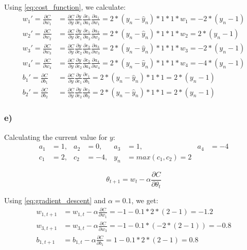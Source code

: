 Using \cref{eq:cost_function}, we calculate: 
\begin{align*}
        w_1' = \frac{ \partial C}{\partial w_1} 
    &= \frac{\partial C}{\partial y} \frac{\partial y}{\partial c_1} 
    \frac{\partial c_1}{\partial a_1} \frac{\partial a_1}{\partial w_1}
    = 2 * (y_n - \hat{y}_n) * 1 * 1 * w_1 = - 2 * (y_n - 1) \\
        w_2' = \frac{\partial C}{\partial w_2} 
    &= \frac{\partial C}{\partial y} \frac{\partial y}{\partial c_1} 
    \frac{\partial c_1}{\partial a_2} \frac{\partial a_2}{\partial w_2}
    = 2 * (y_n - \hat{y}_n) * 1 * 1 * w_2 = 2 * (y_n - 1) \\
        w_3' = \frac{\partial C}{\partial w_3} 
    &= \frac{\partial C}{\partial y} \frac{\partial y}{\partial c_2} 
    \frac{\partial c_2}{\partial a_3} \frac{\partial a_3}{\partial w_3}
    = 2 * (y_n - \hat{y}_n) * 1 * 1 * w_3 = - 2 * (y_n - 1) \\
        w_4' = \frac{\partial C}{\partial w_4} 
    &= \frac{\partial C}{\partial y} \frac{\partial y}{\partial c_2} 
    \frac{\partial c_2}{\partial a_4} \frac{\partial a_4}{\partial w_4}
    = 2 * (y_n - \hat{y}_n) * 1 * 1 * w_4 = - 4 * (y_n - 1) \\
        b_1' = \frac{\partial C}{\partial b_1} 
    &= \frac{\partial C}{\partial y} \frac{\partial y}{\partial c_1} 
    \frac{\partial c_1}{\partial b_1} 
    = 2 * (y_n - \hat{y}_n) * 1 * 1 = 2 * (y_n - 1) \\ 
        b_2' = \frac{\partial C}{\partial b_2}
    &= \frac{\partial C}{\partial y} \frac{\partial y}{\partial c_2} 
    \frac{\partial c_2}{\partial b_2} 
    = 2 * (y_n - \hat{y}_n) * 1 * 1 = 2 * (y_n - 1) 
\end{align*}

\subsubsection*{e)}
Calculating the current value for $y$: 
\begin{align*}
    a_1 &= 1,& a_2 &= 0,& a_3 &= 1,& a_4 &= -4 \\
    c_1 &= 2,& c_2 &= -4,& y_n  &= max(c_1, c_2) = 2
\end{align*}

\begin{equation}
    \label{eq:gradient_descent}
    \theta_{t+1} = w_t - \alpha \frac{\partial C}{\partial \theta_t}
\end{equation}

Using \cref{eq:gradient_descent} and $\alpha = 0.1$, we get: 
\begin{align*}
    w_{1, t + 1} 
    &= w_{1, t} - \alpha \frac{ \partial C}{\partial w_1} 
     = -1 - 0.1 * 2 * (2 - 1) = -1.2 \\
    w_{3, t + 1} 
    &= w_{3, t} - \alpha \frac{ \partial C}{\partial w_3} 
     = -1 - 0.1 * (- 2 * (2 - 1)) = - 0.8 \\
    b_{1, t + 1} 
    &= b_{1, t} - \alpha \frac{ \partial C}{\partial b_1} 
     = 1 - 0.1 * 2 * (2 - 1) = 0.8
\end{align*}
